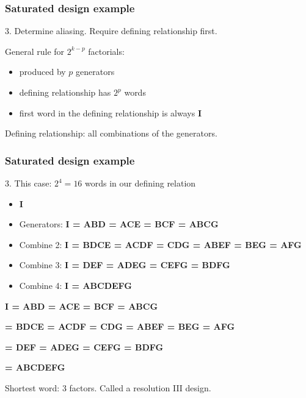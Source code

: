 \begin{frame}\frametitle{Saturated design example}

	3. Determine aliasing. Require defining relationship first.

	General rule for $2^{k-p}$ factorials:
	\begin{itemize}
		\item	produced by $p$ generators
		\item	defining relationship has $2^p$ words
		\item	first word in the defining relationship is always \textbf{I}
	\end{itemize}

	Defining relationship: all combinations of the generators.
\end{frame}

\begin{frame}\frametitle{Saturated design example}

	3. This case: $2^4 = 16$ words in our defining relation
	\begin{itemize}
		\item	\textbf{I}
		\item	Generators: \textbf{I = ABD = ACE = BCF = ABCG}
		\item	Combine 2: \textbf{I = BDCE = ACDF = CDG = ABEF = BEG = AFG}
		\item	Combine 3: \textbf{I = DEF = ADEG = CEFG = BDFG}
		\item	Combine 4: \textbf{I = ABCDEFG}
	\end{itemize}

	\textbf{I = ABD = ACE = BCF = ABCG}

	\textbf{ = BDCE = ACDF = CDG = ABEF = BEG = AFG}

	\textbf{ = DEF = ADEG = CEFG = BDFG }

	\textbf{ = ABCDEFG}

	Shortest word: 3 factors. Called a resolution III design.
\end{frame}

